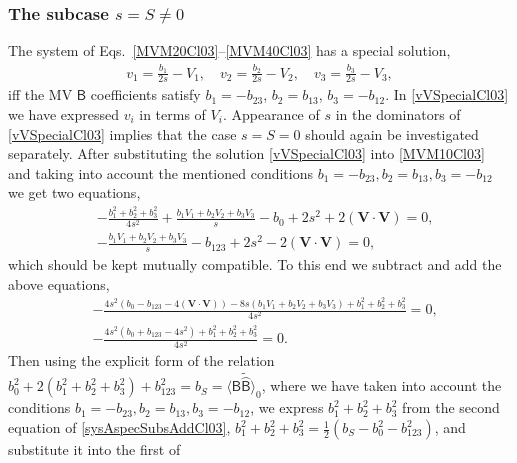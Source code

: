 \documentclass{birkjour}
\newcommand{\cliffordconjugate}[1]{\widetilde{\wideparen{#1}}}
\def\B{\mathsf{B}}
\newcommand{\bV}{\ensuremath{\mathbf{V}}}
\begin{document}
\subsubsection{The subcase $s=S\neq 0$}
The system of  Eqs.~\eqref{MVM20Cl03}--\eqref{MVM40Cl03} has a
special solution,
\begin{equation}\begin{split}\label{vVSpecialCl03}
v_{1}= \frac{b_{1}}{2 s}-V_{1},\quad v_{2}= \frac{b_{2}}{2 s}-V_{2},\quad v_{3}= \frac{b_{3}}{2 s}-V_{3},
\end{split}\end{equation}
iff the MV $\B$ coefficients satisfy $b_1 =-b_{23}$, $b_2 =
b_{13}$,  $b_3= - b_{12}$. In \eqref{vVSpecialCl03} we have
expressed $v_i$ in terms of $V_i$. Appearance of $s$ in the
dominators of \eqref{vVSpecialCl03} implies that the case $s=S=0$
should again be investigated separately. After substituting the
solution \eqref{vVSpecialCl03} into \eqref{MVM10Cl03} and taking
into account the mentioned conditions $b_1 =- b_{23}, b_2 =
b_{13}, b_3= - b_{12}$ we get two equations,
\begin{equation}\begin{split}\label{sysAspecCl03}
  &-\frac{b_{1}^2+b_{2}^2+b_{3}^2}{4 s^2}+\frac{b_{1} V_{1}+b_{2}
  V_{2}+b_{3} V_{3}}{s}-b_{0}+2 s^2+2 (\bV\cdot \bV)=0,\\
&-\frac{b_{1} V_{1}+b_{2}  V_{2}+b_{3} V_{3}}{s}-b_{123}+2 s^2-2 (\bV\cdot \bV)=0,
\end{split}\end{equation}
which should be  kept mutually compatible. To this end we subtract
and add the above equations,
\begin{equation}\begin{split}\label{sysAspecSubsAddCl03}
  &-\frac{4 s^2 \left(b_{0}-b_{123}-4 (\bV\cdot \bV)\right)-8 s (b_{1} V_{1}+b_{2} V_{2}+b_{3} V_{3})+b_{1}^2+b_{2}^2+b_{3}^2}{4 s^2}=0,\\
  &  -\frac{4 s^2 \left(b_{0}+b_{123}-4 s^2\right)+b_{1}^2+b_{2}^2+b_{3}^2}{4 s^2}=0.
\end{split}\end{equation}
Then using the explicit form of the relation $b_0^2 + 2 (b_1^2 + b_2^2
+ b_3^2) + b_{123}^2 = b_S=\langle \B
  \cliffordconjugate{\B}\rangle_0$, where we have taken into account the
conditions $b_1 =- b_{23},  b_2 = b_{13},  b_3= - b_{12}$, we
express $b_{1}^2+b_{2}^2+b_{3}^2$ from the second equation of
\eqref{sysAspecSubsAddCl03}, $b_{1}^2+b_{2}^2+b_{3}^2 =\frac12
(b_S-b_{0}^2-b_{123}^2)$, and substitute it into the first of
\end{document}
